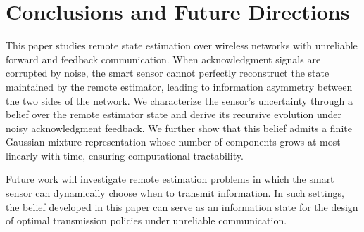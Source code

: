 \documentclass[letterpaper, 10 pt, conference]{ieeeconf}
\begin{document}
\section{Conclusions and Future Directions}\label{sec.conclusion}
This paper studies remote state estimation over wireless networks with unreliable forward and feedback communication. When acknowledgment signals are corrupted by noise, the smart sensor cannot perfectly reconstruct the state maintained by the remote estimator, leading to information asymmetry between the two sides of the network. We characterize the sensor’s uncertainty through a belief over the remote estimator state and derive its recursive evolution under noisy acknowledgment feedback. We further show that this belief admits a finite Gaussian-mixture representation whose number of components grows at most linearly with time, ensuring computational tractability.

Future work will investigate remote estimation problems in which the smart sensor  can dynamically choose when to transmit information. In such settings, the belief developed in this paper can serve as an information state for the design of optimal transmission  policies under unreliable communication.



\appendices
\end{document}

